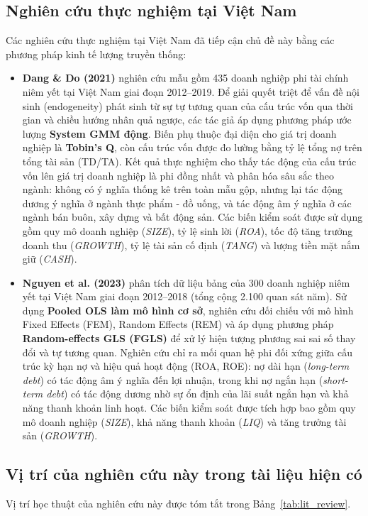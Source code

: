 \documentclass[12pt,a4paper]{article}
\begin{document}
\subsection{Nghiên cứu thực nghiệm tại Việt Nam}
Các nghiên cứu thực nghiệm tại Việt Nam đã tiếp cận chủ đề này bằng các phương pháp kinh tế lượng truyền thống:
\begin{itemize}
    \item \textbf{Dang \& Do (2021)} nghiên cứu mẫu gồm 435 doanh nghiệp phi tài chính niêm yết tại Việt Nam giai đoạn 2012--2019. Để giải quyết triệt để vấn đề nội sinh (endogeneity) phát sinh từ sự tự tương quan của cấu trúc vốn qua thời gian và chiều hướng nhân quả ngược, các tác giả áp dụng phương pháp ước lượng \textbf{System GMM động}. Biến phụ thuộc đại diện cho giá trị doanh nghiệp là \textbf{Tobin's Q}, còn cấu trúc vốn được đo lường bằng tỷ lệ tổng nợ trên tổng tài sản (TD/TA). Kết quả thực nghiệm cho thấy tác động của cấu trúc vốn lên giá trị doanh nghiệp là phi đồng nhất và phân hóa sâu sắc theo ngành: không có ý nghĩa thống kê trên toàn mẫu gộp, nhưng lại tác động dương ý nghĩa ở ngành thực phẩm - đồ uống, và tác động âm ý nghĩa ở các ngành bán buôn, xây dựng và bất động sản. Các biến kiểm soát được sử dụng gồm quy mô doanh nghiệp (\textit{SIZE}), tỷ lệ sinh lời (\textit{ROA}), tốc độ tăng trưởng doanh thu (\textit{GROWTH}), tỷ lệ tài sản cố định (\textit{TANG}) và lượng tiền mặt nắm giữ (\textit{CASH}).
    \item \textbf{Nguyen et al. (2023)} phân tích dữ liệu bảng của 300 doanh nghiệp niêm yết tại Việt Nam giai đoạn 2012--2018 (tổng cộng 2.100 quan sát năm). Sử dụng \textbf{Pooled OLS làm mô hình cơ sở}, nghiên cứu đối chiếu với mô hình Fixed Effects (FEM), Random Effects (REM) và áp dụng phương pháp \textbf{Random-effects GLS (FGLS)} để xử lý hiện tượng phương sai sai số thay đổi và tự tương quan. Nghiên cứu chỉ ra mối quan hệ phi đối xứng giữa cấu trúc kỳ hạn nợ và hiệu quả hoạt động (ROA, ROE): nợ dài hạn (\textit{long-term debt}) có tác động âm ý nghĩa đến lợi nhuận, trong khi nợ ngắn hạn (\textit{short-term debt}) có tác động dương nhờ sự ổn định của lãi suất ngắn hạn và khả năng thanh khoản linh hoạt. Các biến kiểm soát được tích hợp bao gồm quy mô doanh nghiệp (\textit{SIZE}), khả năng thanh khoản (\textit{LIQ}) và tăng trưởng tài sản (\textit{GROWTH}).
\end{itemize}

\subsection{Vị trí của nghiên cứu này trong tài liệu hiện có}
Vị trí học thuật của nghiên cứu này được tóm tắt trong Bảng~\ref{tab:lit_review}.
\end{document}
